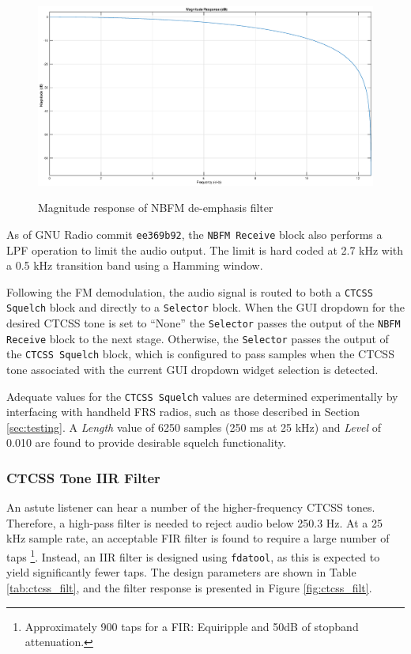 \begin{figure}[h]
  \centering
  \includegraphics[width=6in]{images/frs/filter/rx/fmdemod_tau_mag.eps} \\
  \caption{Magnitude response of NBFM de-emphasis filter}
  \label{fig:deemph_iir}
\end{figure}

As of GNU Radio commit \texttt{ee369b92}, the \texttt{NBFM Receive} block also
performs a \ac{LPF} operation to limit the audio output.  The limit is hard coded
at 2.7 kHz with a 0.5 kHz transition band using a Hamming window.

Following the FM demodulation, the audio signal is routed to both a
\texttt{CTCSS Squelch} block and directly to a \texttt{Selector} block. When the
\ac{GUI} dropdown for the desired \ac{CTCSS} tone is set to ``None'' the
\texttt{Selector} passes the output of the \texttt{NBFM Receive} block to
the next stage. Otherwise, the \texttt{Selector} passes the output of the
\texttt{CTCSS Squelch} block, which is configured to pass samples when the
\ac{CTCSS} tone associated with the current \ac{GUI} dropdown widget selection
is detected.

Adequate values for the \texttt{CTCSS Squelch} values are determined
experimentally by interfacing with handheld \ac{FRS} radios, such as those
described in Section \ref{sec:testing}.
A \textit{Length} value of 6250 samples (250 ms at 25 kHz) and \textit{Level} of
0.010 are found to provide desirable squelch functionality.

\subsubsection{CTCSS Tone IIR Filter}

An astute listener can hear a number of the higher-frequency \ac{CTCSS} tones.
Therefore, a high-pass filter is needed to reject audio below 250.3 Hz. At a 25
kHz sample rate, an acceptable \ac{FIR} filter is found to require a large
number of taps \footnote{Approximately 900 taps for a FIR: Equiripple and 50dB of
stopband attenuation.}.  Instead, an \ac{IIR} filter is designed using \texttt{fdatool},
as this is expected to yield significantly fewer taps. The design parameters are
shown in Table \ref{tab:ctcss_filt}, and the filter response is presented in
Figure \ref{fig:ctcss_filt}.

